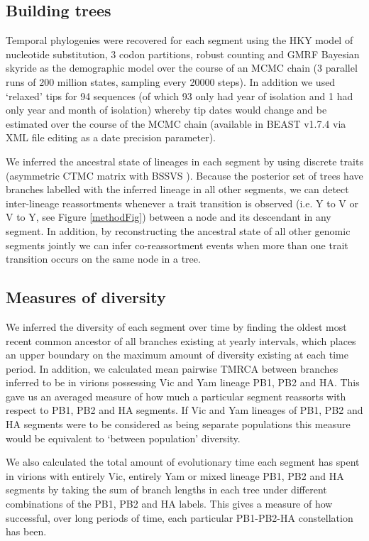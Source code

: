 \documentclass[11pt,oneside,letterpaper]{article}
\begin{document}
\subsection*{Building trees}
Temporal phylogenies were recovered for each segment using the HKY model of nucleotide substitution, 3 codon partitions, robust counting \cite{obrien2009} and GMRF Bayesian skyride \cite{minin2008} as the demographic model over the course of an MCMC chain (3 parallel runs of 200 million states, sampling every 20000 steps).
In addition we used `relaxed' tips for 94 sequences (of which 93 only had year of isolation and 1 had only year and month of isolation) whereby tip dates would change and be estimated over the course of the MCMC chain (available in BEAST v1.7.4 \cite{drummond2012} via XML file editing as a date precision parameter).

We inferred the ancestral state of lineages in each segment by using discrete traits (asymmetric CTMC matrix with BSSVS \cite{lemey2009}). Because the posterior set of trees have branches labelled with the inferred lineage in all other segments, we can detect inter-lineage reassortments whenever a trait transition is observed (i.e. Y to V or V to Y, see Figure \ref{methodFig}) between a node and its descendant in any segment. 
In addition, by reconstructing the ancestral state of all other genomic segments jointly we can infer co-reassortment events when more than one trait transition occurs on the same node in a tree.

\subsection*{Measures of diversity}
We inferred the diversity of each segment over time by finding the oldest most recent common ancestor of all branches existing at yearly intervals, which places an upper boundary on the maximum amount of diversity existing at each time period.
In addition, we calculated mean pairwise TMRCA between branches inferred to be in virions possessing Vic and Yam lineage PB1, PB2 and HA.
This gave us an averaged measure of how much a particular segment reassorts with respect to PB1, PB2 and HA segments.
If Vic and Yam lineages of PB1, PB2 and HA segments were to be considered as being separate populations this measure would be equivalent to `between population' diversity.

We also calculated the total amount of evolutionary time each segment has spent in virions with entirely Vic, entirely Yam or mixed lineage PB1, PB2 and HA segments by taking the sum of branch lengths in each tree under different combinations of the PB1, PB2 and HA labels.
This gives a measure of how successful, over long periods of time, each particular PB1-PB2-HA constellation has been.
\end{document}
